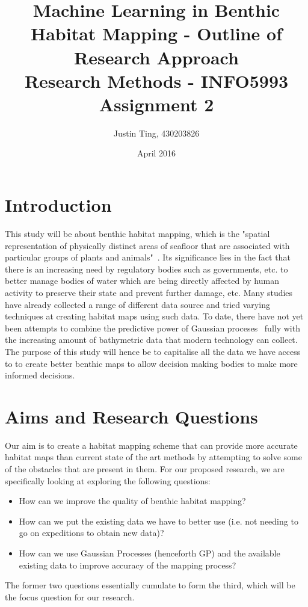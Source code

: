 \documentclass[12pt]{article}
\title{Machine Learning in Benthic Habitat Mapping - Outline of Research Approach\\ Research Methods - INFO5993 Assignment 2}
\author{Justin Ting, 430203826}
\date{April 2016}
\begin{document}
\maketitle

\section {Introduction}
This study will be about benthic habitat mapping, which is the "spatial representation of physically distinct areas of seafloor that are associated with particular groups of plants and animals"~\citep{harris12}. Its significance lies in the fact that there is an increasing need by regulatory bodies such as governments, etc. to better manage bodies of water which are being directly affected by human activity to preserve their state and prevent further damage, etc. Many studies have already collected a range of different data source and tried varying techniques at creating habitat maps using such data. To date, there have not yet been attempts to combine the predictive power of Gaussian proceses~\citep{bender12} fully with the increasing amount of bathymetric data that modern technology can collect. The purpose of this study will hence be to capitalise all the data we have access to to create better benthic maps to allow decision making bodies to make more informed decisions.

\section{Aims and Research Questions}
Our aim is to create a habitat mapping scheme that can provide more accurate habitat maps than current state of the art methods by attempting to solve some of the obstacles that are present in them. For our proposed research, we are specifically looking at exploring the following questions:
\begin{itemize}
    \item How can we improve the quality of benthic habitat mapping?
    \item How can we put the existing data we have to better use (i.e. not needing to go on expeditions to obtain new data)?
    \item How can we use Gaussian Processes (henceforth GP) and the available existing data to improve accuracy of the mapping process?
\end{itemize}
The former two questions essentially cumulate to form the third, which will be the focus question for our research. 
\end{document}

